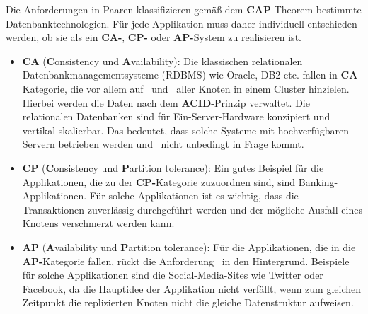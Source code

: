 Die Anforderungen in Paaren klassifizieren gemäß dem \textbf{CAP}-Theorem bestimmte Datenbanktechnologien. Für jede Applikation muss daher individuell entschieden werden, ob sie als ein \textbf{CA-}, \textbf{CP-} oder \textbf{AP-}System zu realisieren ist.
\begin{itemize}
\item \textbf{CA} (\textbf{C}onsistency und \textbf{A}vailability): Die klassischen relationalen Datenbankmanagementsysteme (RDBMS) wie Oracle, DB2 etc. fallen in \textbf{CA}-Kategorie, die vor allem auf  \Cap\ und \cAp\ aller Knoten in einem Cluster hinzielen. Hierbei werden die Daten nach dem \textbf{ACID}-Prinzip verwaltet. Die relationalen Datenbanken sind für Ein-Server-Hardware konzipiert und vertikal skalierbar. Das bedeutet, dass solche Systeme mit hochverfügbaren Servern betrieben werden und \caP\  nicht unbedingt in Frage kommt.


\item \textbf{CP} (\textbf{C}onsistency und \textbf{P}artition tolerance): Ein gutes Beispiel für die Applikationen, die zu der \textbf{CP-}Kategorie zuzuordnen sind, sind Banking-Applikationen. Für solche Applikationen ist es wichtig, dass die Transaktionen zuverlässig durchgeführt werden und der mögliche Ausfall eines Knotens verschmerzt werden kann. 
%

\item \textbf{AP} (\textbf{A}vailability und \textbf{P}artition tolerance): Für die Applikationen, die in die \textbf{AP-}Kategorie fallen, rückt die Anforderung \Cap\ in den Hintergrund. Beispiele für solche Applikationen sind die Social-Media-Sites wie Twitter oder Facebook, da die Hauptidee der Applikation nicht verfällt, wenn zum gleichen Zeitpunkt die replizierten Knoten nicht die gleiche Datenstruktur aufweisen. 
\end{itemize}
